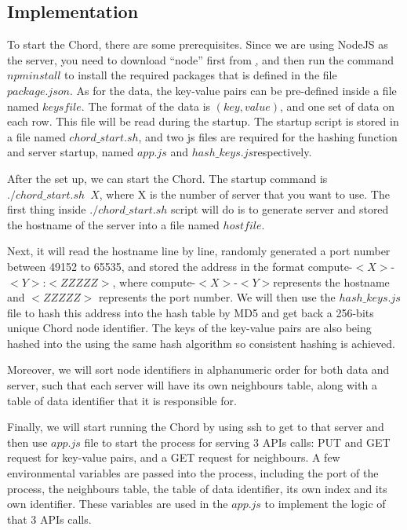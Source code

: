 \documentclass[a4paper]{article}
\begin{document}
\subsection{Implementation}

To start the Chord, there are some prerequisites. Since we are using NodeJS as the server, you need to download “node” first from \href{https://raw.githubusercontent.com/creationix/nvm/v0.33.2/install.sh}, and then run the command \texttt{$npm install$} to install the required packages that is defined in the file \texttt{$package.json$}.  As for the data, the key-value pairs can be pre-defined inside a file named \texttt{$keysfile$}. The format of the data is $(key,value)$, and one set of data on each row. This file will be read during the startup. The startup script is stored in a file named \texttt{$chord\_start.sh$}, and two js files are required for the hashing function and server startup, named \texttt{$app.js$} and \texttt{$hash\_keys.js$}respectively.

After the set up, we can start the Chord. The startup command is \texttt{$./chord\_start.sh\enspace X$}, where X is the number of server that you want to use. The first thing inside \texttt{$./chord\_start.sh$} script will do is to generate server and stored the hostname of the server into a file named \texttt{$hostfile$}. 

Next, it will read the hostname line by line, randomly generated a port number between 49152 to 65535, and stored the address in the format compute-$<X>$-$<Y>$:$<ZZZZZ>$, where compute-$<X>$-$<Y>$represents the hostname and $<ZZZZZ>$ represents the port number. We will then use the \texttt{$hash\_keys.js$} file to hash this address into the hash table by MD5 and get back a 256-bits unique Chord node identifier. The keys of the key-value pairs are also being hashed into the using the same hash algorithm so consistent hashing is achieved. 

Moreover, we will sort node identifiers in alphanumeric order for both data and server, such that each server will have its own neighbours table, along with a table of data identifier that it is responsible for. 

Finally, we will start running the Chord by using ssh to get to that server and then use \texttt{$app.js$} file to start the process for serving 3 APIs calls: PUT and GET request for key-value pairs, and a GET request for neighbours. A few environmental variables are passed into the process, including the port of the process, the neighbours table, the table of data identifier, its own index and its own identifier. These variables are used in the \texttt{$app.js$} to implement the logic of that 3 APIs calls.
\end{document}

